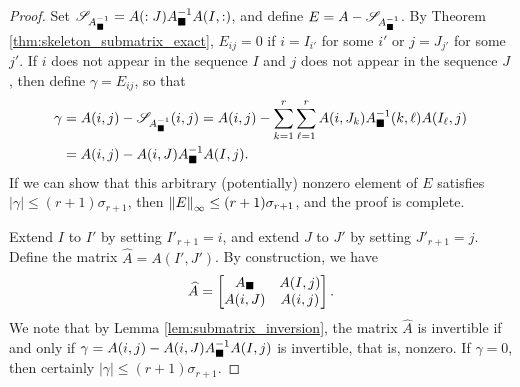 \documentclass{article}
\begin{document}
	\newcommand{\biggermat}{\widehat{A}}
	\begin{proof}
		Set $\mathscr{S}_{A_\blacksquare^{-1}} =A(:J)A_\blacksquare^{-1}A(I,:)$, and define $E = A - \mathscr{S}_{A_\blacksquare^{-1}}$. By Theorem \ref{thm:skeleton_submatrix_exact}, $E_{ij} = 0$ if $i =I_{i'}$ for some $i'$ or $j = J_{j'}$ for some $j'$. If $i$ does not appear in the sequence $I$ and $j$ does not appear in the sequence $J$, then define $\gamma = E_{ij}$, so that
		\begin{align}
			\gamma &= A(i,j) - \mathscr{S}_{A_\blacksquare^{-1}}(i,j) = A(i,j) - \sum_{k=1}^r\sum_{\ell=1}^rA(i,J_k)A_\blacksquare^{-1}(k,\ell)A(I_\ell,j) \\
			&= A(i,j) - A(i,J)A_\blacksquare^{-1}A(I,j).
		\end{align}
		If we can show that this arbitrary (potentially) nonzero element of $E$ satisfies $|\gamma| \le (r+1)\sigma_{r+1}$, then $\left\lVert E \right\rVert_\infty \le (r+1)\sigma_{r+1}$, and the proof is complete.
		
		Extend $I$ to $I'$ by setting $I'_{r+1} = i$, and extend $J$ to $J'$ by setting $J'_{r+1} = j$. Define the matrix $\biggermat = A(I',J')$. By construction, we have
		\begin{equation}
			\biggermat = \left[\begin{matrix}
				A_\msq &  A(I, j) \\
				A(i, J) & A(i,j)
			\end{matrix}\right].
		\end{equation}
		We note that by Lemma \ref{lem:submatrix_inversion}, the matrix $\biggermat$ is invertible if and only if $\gamma = A(i,j) - A(i,J)A_\blacksquare^{-1}A(I,j)$ is invertible, that is, nonzero. If $\gamma = 0$, then certainly $|\gamma| \le (r+1)\sigma_{r+1}$. 
		

\end{proof}
\end{document}
